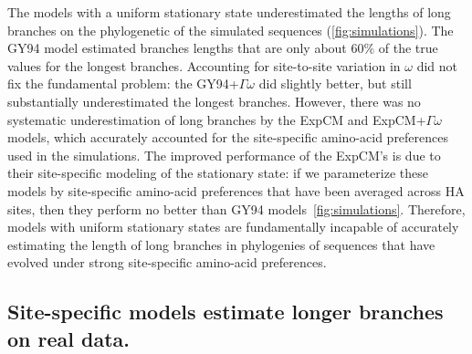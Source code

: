 \documentclass[11pt]{article}
\begin{document}
The models with a uniform stationary state underestimated the lengths of long branches on the phylogenetic of the simulated sequences (\ref{fig:simulations}). 
The GY94 model estimated branches lengths that are only about 60\% of the true values for the longest branches. 
Accounting for site-to-site variation in $\omega$ did not fix the fundamental problem: the GY94+$\Gamma\omega$ did slightly better, but still substantially underestimated the longest branches.
However, there was no systematic underestimation of long branches by the ExpCM and ExpCM+$\Gamma\omega$ models, which accurately accounted for the site-specific amino-acid preferences used in the simulations.
The improved performance of the ExpCM's is due to their site-specific modeling of the stationary state: if we parameterize these models by site-specific amino-acid preferences that have been averaged across HA sites, then they perform no better than GY94 models~\ref{fig:simulations}.
Therefore, models with uniform stationary states are fundamentally incapable of accurately estimating the length of long branches in phylogenies of sequences that have evolved under strong site-specific amino-acid preferences.


\subsection*{Site-specific models estimate longer branches on real data.}
\end{document}
